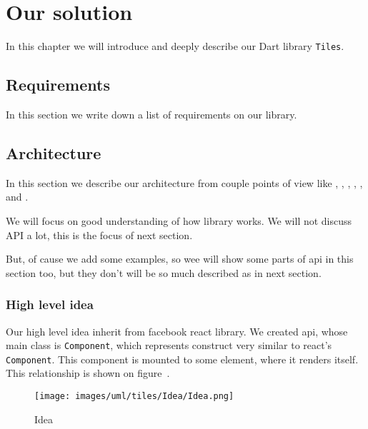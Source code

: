 \chapter{Our solution}\label{chap:oursolution}

In this chapter we will introduce and deeply describe our Dart library \texttt{Tiles}.


\section{Requirements}\label{subsec:our-architecture-requirements}

  In this section we write down a list of requirements on our library.

\section{Architecture}\label{sec:our-architecture}

  In this section we describe our architecture from couple points of view like , 
  , 
  , 
  , 
  , 
   and
  .

  We will focus on good understanding of how library works. 
  We will not discuss API a lot, this is the focus of next section. 

  But, of cause we add some examples, so wee will show some parts of api in this section too, 
  but they don't will be so much described as in next section.

  \subsection{High level idea}\label{subsec:our-architecture-idea}
    Our high level idea inherit from facebook react library. 
    We created api, whose main class is \texttt{Component}, which represents construct very similar to react's \texttt{Component}.
    This component is mounted to some element, where it renders itself. 
    This relationship is shown on figure~.
    \begin{figure}[h]
    \centering  
      \texttt{[image: images/uml/tiles/Idea/Idea.png]}
      \caption{Idea}
      \label{img:library-idea}
    \end{figure}


